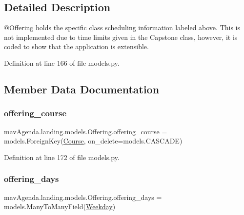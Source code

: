 \subsection{Detailed Description}
\begin{DoxyVerb}@Offering holds the specific class scheduling information labeled above.
        This is not implemented due to time limits given in the Capstone class,
        however, it is coded to show that the application is extensible.
\end{DoxyVerb}
 

Definition at line 166 of file models.\+py.



\subsection{Member Data Documentation}
\mbox{\label{classmavAgenda_1_1landing_1_1models_1_1Offering_a5bc0a7b2c9fdc892d7b2a1150db5ab0e}} 
\subsubsection{\texorpdfstring{offering\+\_\+course}{offering\_course}}
{\footnotesize\ttfamily mav\+Agenda.\+landing.\+models.\+Offering.\+offering\+\_\+course = models.\+Foreign\+Key(\mbox{\hyperlink{classmavAgenda_1_1landing_1_1models_1_1Course}{Course}}, on\+\_\+delete=models.\+C\+A\+S\+C\+A\+DE)\hspace{0.3cm}{\ttfamily [static]}}



Definition at line 172 of file models.\+py.

\mbox{\label{classmavAgenda_1_1landing_1_1models_1_1Offering_ae73b33d9b47f9afc6c24bb2f64cdbb65}} 
\subsubsection{\texorpdfstring{offering\+\_\+days}{offering\_days}}
{\footnotesize\ttfamily mav\+Agenda.\+landing.\+models.\+Offering.\+offering\+\_\+days = models.\+Many\+To\+Many\+Field(\mbox{\hyperlink{classmavAgenda_1_1landing_1_1models_1_1Weekday}{Weekday}})\hspace{0.3cm}{\ttfamily [static]}}



